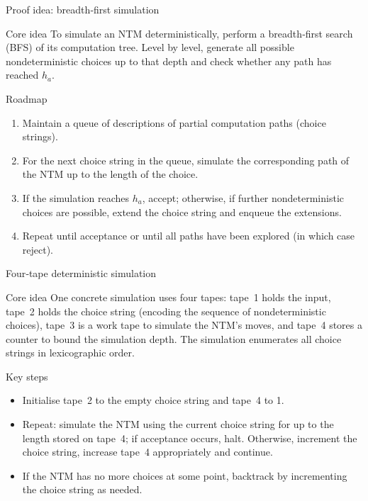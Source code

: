 \begin{frame}[t]{Proof idea: breadth‑first simulation}
  \begin{tblock}{Core idea}
    To simulate an NTM deterministically, perform a breadth‑first
    search (BFS) of its computation tree.  Level by level, generate
    all possible nondeterministic choices up to that depth and check
    whether any path has reached $h_a$.
  \end{tblock}
  \begin{tblock}{Roadmap}
    \begin{enumerate}
      \item Maintain a queue of descriptions of partial computation
        paths (choice strings).
      \item For the next choice string in the queue, simulate the
        corresponding path of the NTM up to the length of the choice.
      \item If the simulation reaches $h_a$, accept; otherwise, if
        further nondeterministic choices are possible, extend the
        choice string and enqueue the extensions.
      \item Repeat until acceptance or until all paths have been
        explored (in which case reject).
    \end{enumerate}
  \end{tblock}
  \label{fr:7.7-07}
\end{frame}

\begin{frame}[t]{Four‑tape deterministic simulation}
  \begin{tblock}{Core idea}
    One concrete simulation uses four tapes: tape 1 holds the input,
    tape 2 holds the choice string (encoding the sequence of
    nondeterministic choices), tape 3 is a work tape to simulate the
    NTM’s moves, and tape 4 stores a counter to bound the simulation
    depth.  The simulation enumerates all choice strings in
    lexicographic order.
  \end{tblock}
  \begin{tblock}{Key steps}
    \begin{itemize}
      \item Initialise tape 2 to the empty choice string and tape 4 to 1.
      \item Repeat: simulate the NTM using the current choice string
        for up to the length stored on tape 4; if acceptance occurs,
        halt.  Otherwise, increment the choice string, increase tape 4
        appropriately and continue.
      \item If the NTM has no more choices at some point, backtrack by
        incrementing the choice string as needed.
    \end{itemize}
  \end{tblock}
  \label{fr:7.7-08}
\end{frame}

